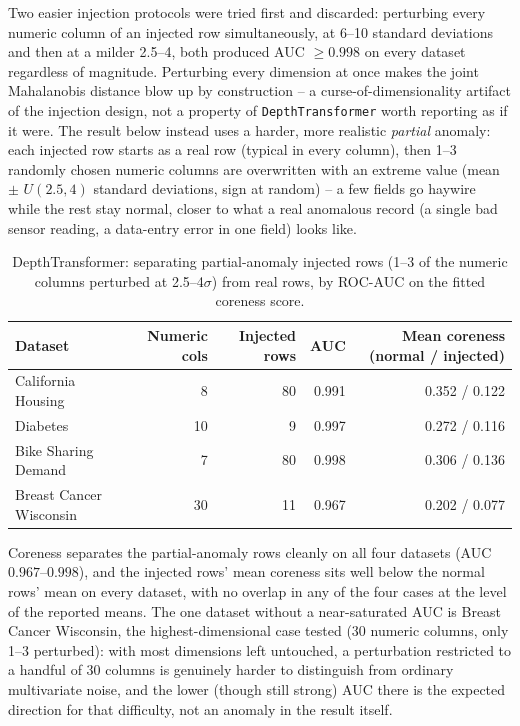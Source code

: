 \documentclass[11pt]{article}
\begin{document}
Two easier injection protocols were tried first and discarded: perturbing
every numeric column of an injected row simultaneously, at 6--10 standard
deviations and then at a milder 2.5--4, both produced AUC $\geq 0.998$ on
every dataset regardless of magnitude. Perturbing every dimension at once
makes the joint Mahalanobis distance blow up by construction -- a
curse-of-dimensionality artifact of the injection design, not a property of
\texttt{DepthTransformer} worth reporting as if it were. The result below
instead uses a harder, more realistic \emph{partial} anomaly: each injected
row starts as a real row (typical in every column), then 1--3 randomly
chosen numeric columns are overwritten with an extreme value (mean $\pm$
$U(2.5, 4)$ standard deviations, sign at random) -- a few fields go
haywire while the rest stay normal, closer to what a real anomalous record
(a single bad sensor reading, a data-entry error in one field) looks like.

\begin{table}[h]
\centering
\caption{DepthTransformer: separating partial-anomaly injected rows (1--3 of the numeric columns perturbed at 2.5--4$\sigma$) from real rows, by ROC-AUC on the fitted coreness score.}
\label{tab:depth}
\begin{tabular}{lrrrr}
\toprule
Dataset & Numeric cols & Injected rows & AUC & Mean coreness (normal / injected) \\
\midrule
California Housing & 8 & 80 & 0.991 & 0.352 / 0.122 \\
Diabetes & 10 & 9 & 0.997 & 0.272 / 0.116 \\
Bike Sharing Demand & 7 & 80 & 0.998 & 0.306 / 0.136 \\
Breast Cancer Wisconsin & 30 & 11 & 0.967 & 0.202 / 0.077 \\
\bottomrule
\end{tabular}
\end{table}

Coreness separates the partial-anomaly rows cleanly on all four datasets
(AUC $0.967$--$0.998$), and the injected rows' mean coreness sits well
below the normal rows' mean on every dataset, with no overlap in any of the
four cases at the level of the reported means. The one dataset without a
near-saturated AUC is Breast Cancer Wisconsin, the highest-dimensional case
tested (30 numeric columns, only 1--3 perturbed): with most dimensions left
untouched, a perturbation restricted to a handful of 30 columns is
genuinely harder to distinguish from ordinary multivariate noise, and the
lower (though still strong) AUC there is the expected direction for that
difficulty, not an anomaly in the result itself.
\end{document}
